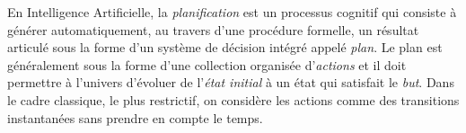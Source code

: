 
En Intelligence Artificielle, la \emph{planification} est un processus cognitif qui consiste à générer automatiquement, au travers d'une procédure formelle, un résultat articulé sous la forme d'un système de décision intégré appelé \emph{plan}. Le plan est généralement sous la forme d'une collection organisée d'\emph{actions} et il doit permettre à l'univers d'évoluer de l'\emph{état initial} à un état qui satisfait le \emph{but}. Dans le cadre classique, le plus restrictif, on considère les actions comme des transitions instantanées sans prendre en compte le temps.




